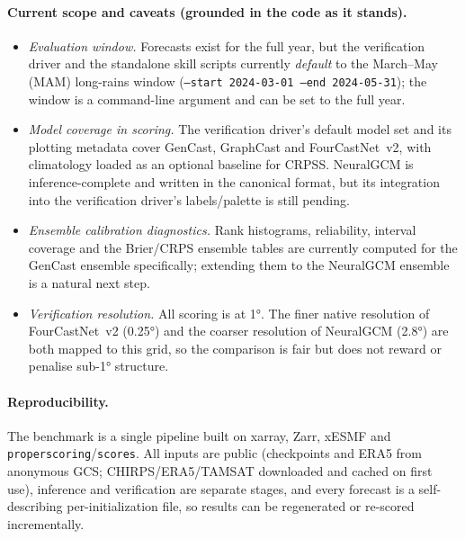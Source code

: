 \documentclass[11pt]{article}
\newcommand{\code}[1]{\texttt{\small #1}}
\begin{document}
\paragraph{Current scope and caveats (grounded in the code as it stands).}
\begin{itemize}[nosep,leftmargin=1.4em]
  \item \emph{Evaluation window.} Forecasts exist for the full year, but the
        verification driver and the standalone skill scripts currently
        \emph{default} to the March--May (MAM) long-rains window
        (\code{--start 2024-03-01 --end 2024-05-31}); the window is a command-line
        argument and can be set to the full year.
  \item \emph{Model coverage in scoring.} The verification driver's default
        model set and its plotting metadata cover GenCast, GraphCast and
        FourCastNet~v2, with climatology loaded as an optional baseline for
        CRPSS. NeuralGCM is inference-complete and written in the canonical
        format, but its integration into the verification driver's
        labels/palette is still pending.
  \item \emph{Ensemble calibration diagnostics.} Rank histograms, reliability,
        interval coverage and the Brier/CRPS ensemble tables are currently
        computed for the GenCast ensemble specifically; extending them to the
        NeuralGCM ensemble is a natural next step.
  \item \emph{Verification resolution.} All scoring is at \ang{1}. The finer
        native resolution of FourCastNet~v2 (\ang{0.25}) and the coarser
        resolution of NeuralGCM (\ang{2.8}) are both mapped to this grid, so the
        comparison is fair but does not reward or penalise sub-\ang{1}
        structure.
\end{itemize}

\paragraph{Reproducibility.} The benchmark is a single pipeline built on xarray,
Zarr, xESMF and \code{properscoring}/\code{scores}. All inputs are public
(checkpoints and ERA5 from anonymous GCS; CHIRPS/ERA5/TAMSAT downloaded and
cached on first use), inference and verification are separate stages, and every
forecast is a self-describing per-initialization file, so results can be
regenerated or re-scored incrementally.
\end{document}
